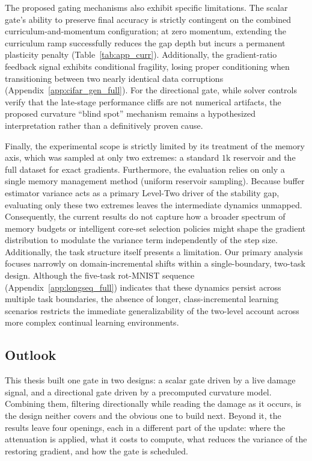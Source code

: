 The proposed gating mechanisms also exhibit specific limitations. The scalar gate's ability to preserve final accuracy is strictly contingent on the combined curriculum-and-momentum configuration; at zero momentum, extending the curriculum ramp successfully reduces the gap depth but incurs a permanent plasticity penalty (Table~\ref{tab:app_curr}). Additionally, the gradient-ratio feedback signal exhibits conditional fragility, losing proper conditioning when transitioning between two nearly identical data corruptions (Appendix~\ref{app:cifar_gen_full}). For the directional gate, while solver controls verify that the late-stage performance cliffs are not numerical artifacts, the proposed curvature ``blind spot'' mechanism remains a hypothesized interpretation rather than a definitively proven cause.

Finally, the experimental scope is strictly limited by its treatment of the memory axis, which was sampled at only two extremes: a standard $1$k reservoir and the full dataset for exact gradients. Furthermore, the evaluation relies on only a single memory management method (uniform reservoir sampling). Because buffer estimator variance acts as a primary Level-Two driver of the stability gap, evaluating only these two extremes leaves the intermediate dynamics unmapped. Consequently, the current results do not capture how a broader spectrum of memory budgets or intelligent core-set selection policies \citep{aljundi2019gradientbasedsampleselection, bang2021rainbowmemorycontinuallearning} might shape the gradient distribution to modulate the variance term independently of the step size. Additionally, the task structure itself presents a limitation. Our primary analysis focuses narrowly on domain-incremental shifts within a single-boundary, two-task design. Although the five-task rot-MNIST sequence (Appendix~\ref{app:longseq_full}) indicates that these dynamics persist across multiple task boundaries, the absence of longer, class-incremental learning scenarios restricts the immediate generalizability of the two-level account across more complex continual learning environments.

\subsection{Outlook}
\label{subsec:disc_outlook}

This thesis built one gate in two designs: a scalar gate driven by a live damage signal, and a directional gate driven by a precomputed curvature model. Combining them, filtering directionally while reading the damage as it occurs, is the design neither covers and the obvious one to build next. Beyond it, the results leave four openings, each in a different part of the update: where the attenuation is applied, what it costs to compute, what reduces the variance of the restoring gradient, and how the gate is scheduled.

